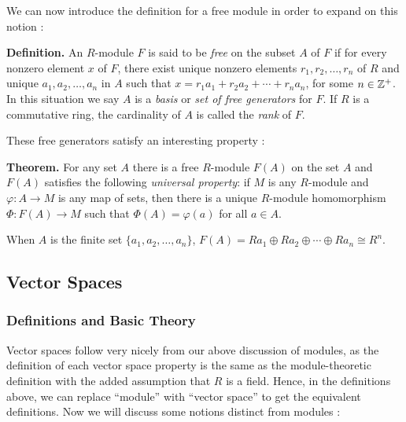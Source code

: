 \documentclass[11pt, reqno]{amsart}
\theoremstyle{plain}
\theoremstyle{definition}
\theoremstyle{example}
\begin{document}
\par
We can now introduce the definition for a free module in order to expand on this notion \cite[\S 10.3, p. 354]{dummit}:

\par
\textbf{Definition.} An $R$-module $F$ is said to be \textit{free} on the subset $A$ of $F$ if for every nonzero element $x$ of $F$, there exist unique nonzero elements $r_1, r_2, \ldots, r_n$ of $R$ and unique $a_1, a_2, \ldots, a_n$ in $A$ such that $x = r_1a_1 + r_2a_2 + \cdots + r_na_n$, for some $n \in \mathbb{Z}^+$. In this situation we say $A$ is a \textit{basis} or \textit{set of free generators} for $F$. If $R$ is a commutative ring, the cardinality of $A$ is called the \textit{rank} of $F$.

These free generators satisfy an interesting property \cite[\S 10.3, p. 354]{dummit}:

\par
\textbf{Theorem.} For any set $A$ there is a free $R$-module $F(A)$ on the set $A$ and $F(A)$ satisfies the following \textit{universal property}: if $M$ is any $R$-module and $\varphi: A \to M$ is any map of sets, then there is a unique $R$-module homomorphism $\Phi: F(A) \to M$ such that $\Phi(A) = \varphi(a)$ for all $a \in A$.

\par
When $A$ is the finite set $\{a_1, a_2, \ldots, a_n\}$, $F(A) = Ra_1 \oplus Ra_2 \oplus \cdots \oplus Ra_n \cong R^n$.


\newpage
\subsection{Vector Spaces}


\subsubsection{Definitions and Basic Theory}

Vector spaces follow very nicely from our above discussion of modules, as the definition of each vector space property is the same as the module-theoretic definition with the added assumption that $R$ is a field. Hence, in the definitions above, we can replace ``module'' with ``vector space'' to get the equivalent definitions. Now we will discuss some notions distinct from modules \cite[\S 11.1, p. 409]{dummit}:
\end{document}
